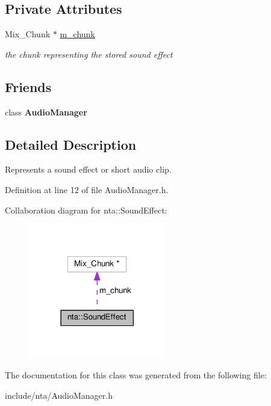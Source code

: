 \subsection*{Private Attributes}
\begin{DoxyCompactItemize}
\item 
\mbox{\label{classnta_1_1SoundEffect_a406ecb51cdbc1e757d72fae4fb35794f}} 
Mix\+\_\+\+Chunk $\ast$ \hyperlink{classnta_1_1SoundEffect_a406ecb51cdbc1e757d72fae4fb35794f}{m\+\_\+chunk}
\begin{DoxyCompactList}\small\item\em the chunk representing the stored sound effect \end{DoxyCompactList}\end{DoxyCompactItemize}
\subsection*{Friends}
\begin{DoxyCompactItemize}
\item 
\mbox{\label{classnta_1_1SoundEffect_a85edaa7e5c3ae68dabadd5373890591e}} 
class {\bfseries Audio\+Manager}
\end{DoxyCompactItemize}


\subsection{Detailed Description}
Represents a sound effect or short audio clip. 

Definition at line 12 of file Audio\+Manager.\+h.



Collaboration diagram for nta\+:\+:Sound\+Effect\+:
\nopagebreak
\begin{figure}[H]
\begin{center}
\leavevmode
\includegraphics[width=170pt]{d7/d8e/classnta_1_1SoundEffect__coll__graph}
\end{center}
\end{figure}


The documentation for this class was generated from the following file\+:\begin{DoxyCompactItemize}
\item 
include/nta/Audio\+Manager.\+h\end{DoxyCompactItemize}
